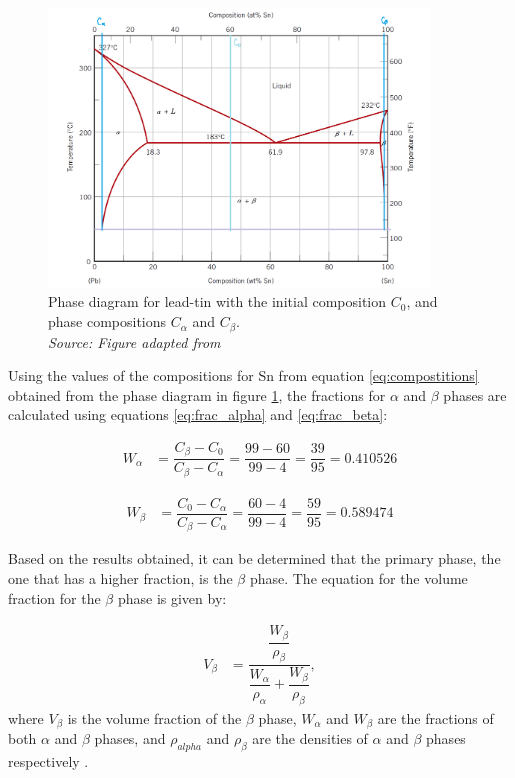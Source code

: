 \begin{figure}[h]
    \centering
    \includegraphics[width=0.9\textwidth]{graficas/diagrama.png}
    \caption{Phase diagram for lead-tin with the initial composition $C_0$, and phase compositions $C_{\alpha}$ and $C_{\beta}$.\\
    \textit{Source: Figure adapted from \citet[p.~300]{callister2010materials}}}
    \label{fig:diagrama}
\end{figure}

Using the values of the compositions for Sn from equation \ref{eq:compostitions} obtained from the phase diagram in figure \ref{fig:diagrama}, the fractions for $\alpha$ and $\beta$ phases are calculated using equations \eqref{eq:frac_alpha} and \eqref{eq:frac_beta}:

\begin{align}
    \label{eq:w_alpha}
    W_{\alpha}&=\dfrac{C_{\beta}-C_0}{C_{\beta}-C_{\alpha}} =\dfrac{99-60}{99-4} = \dfrac{39}{95} = 0.410526
\end{align}

\begin{align}
    \label{eq:w_beta}
    W_{\beta}&=\dfrac{C_0-C_{\alpha}}{C_{\beta}-C_{\alpha}} =\dfrac{60-4}{99-4} =\dfrac{59}{95} =0.589474
\end{align}

Based on the results obtained, it can be determined that the primary phase, the one that has a higher fraction, is the $\beta$ phase. The equation for the volume fraction for the $\beta$ phase is given by:

\begin{align}
    \label{eq:vol_beta}
    V_{\beta}&=\dfrac{\dfrac{W_{\beta}}{\rho_{\beta}}}{\dfrac{W_{\alpha}}{\rho_{\alpha}}+\dfrac{W_{\beta}}{\rho_{\beta}}},
\end{align}
where $V_{\beta}$ is the volume fraction of the $\beta$ phase, $W_{\alpha}$ and $W_{\beta}$ are the fractions of both $\alpha$ and $\beta$ phases, and $\rho_{alpha}$ and $\rho_{\beta}$ are the densities of $\alpha$ and $\beta$ phases respectively \citep[p.~293]{callister2010materials}.

